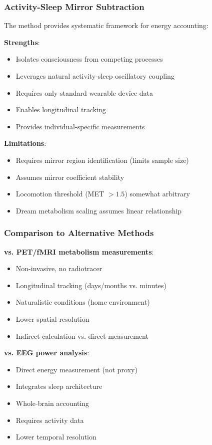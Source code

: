 \documentclass[12pt,twocolumn]{article}
\theoremstyle{remark}
\begin{document}
\subsubsection{Activity-Sleep Mirror Subtraction}

The method provides systematic framework for energy accounting:

\textbf{Strengths}:
\begin{itemize}
\item Isolates consciousness from competing processes
\item Leverages natural activity-sleep oscillatory coupling
\item Requires only standard wearable device data
\item Enables longitudinal tracking
\item Provides individual-specific measurements
\end{itemize}

\textbf{Limitations}:
\begin{itemize}
\item Requires mirror region identification (limits sample size)
\item Assumes mirror coefficient stability
\item Locomotion threshold (MET $> 1.5$) somewhat arbitrary
\item Dream metabolism scaling assumes linear relationship
\end{itemize}

\subsubsection{Comparison to Alternative Methods}

\textbf{vs. PET/fMRI metabolism measurements}:
\begin{itemize}
\item [\checkmark] Non-invasive, no radiotracer
\item [\checkmark] Longitudinal tracking (days/months vs. minutes)
\item [\checkmark] Naturalistic conditions (home environment)
\item [×] Lower spatial resolution
\item [×] Indirect calculation vs. direct measurement
\end{itemize}

\textbf{vs. EEG power analysis}:
\begin{itemize}
\item [\checkmark] Direct energy measurement (not proxy)
\item [\checkmark] Integrates sleep architecture
\item [\checkmark] Whole-brain accounting
\item [×] Requires activity data
\item [×] Lower temporal resolution
\end{itemize}
\end{document}
